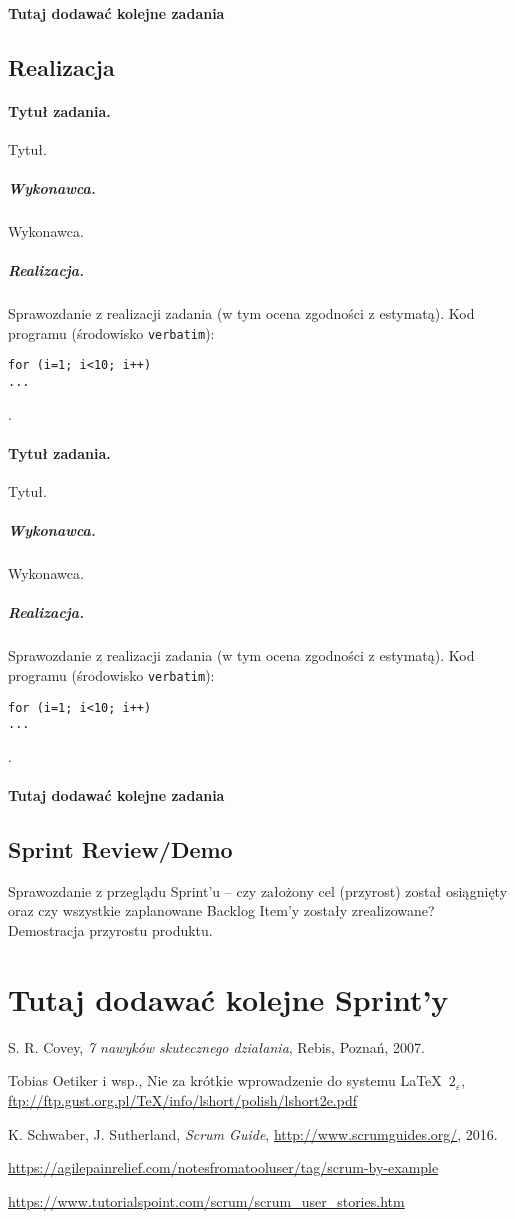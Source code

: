 \documentclass[a4paper]{article}
\begin{document}
\paragraph{Tutaj dodawać kolejne zadania}

\subsection{Realizacja}

\paragraph{Tytuł zadania.} Tytuł.
\subparagraph{Wykonawca.} Wykonawca.
\subparagraph{Realizacja.} Sprawozdanie z realizacji zadania (w tym ocena zgodności z estymatą). Kod programu (środowisko \texttt{verbatim}): \begin{verbatim}
for (i=1; i<10; i++)
...
\end{verbatim}.

\paragraph{Tytuł zadania.} Tytuł.
\subparagraph{Wykonawca.} Wykonawca.
\subparagraph{Realizacja.} Sprawozdanie z realizacji zadania (w tym ocena zgodności z estymatą). Kod programu (środowisko \texttt{verbatim}): \begin{verbatim}
for (i=1; i<10; i++)
...
\end{verbatim}.

\paragraph{Tutaj dodawać kolejne zadania}


\subsection{Sprint Review/Demo}
Sprawozdanie z przeglądu Sprint'u -- czy założony cel (przyrost) został osiągnięty oraz czy wszystkie zaplanowane Backlog Item'y zostały zrealizowane? Demostracja przyrostu produktu.


\section*{Tutaj dodawać kolejne Sprint'y}


\begin{thebibliography}{9}

 S. R. Covey, {\em 7 nawyków skutecznego działania}, Rebis, Poznań, 2007.

 Tobias Oetiker i wsp., Nie za krótkie wprowadzenie do systemu \LaTeX  \ $2_\varepsilon$, \url{ftp://ftp.gust.org.pl/TeX/info/lshort/polish/lshort2e.pdf}

 K. Schwaber, J. Sutherland, {\em Scrum Guide}, \url{http://www.scrumguides.org/}, 2016.

 \url{https://agilepainrelief.com/notesfromatooluser/tag/scrum-by-example}

 \url{https://www.tutorialspoint.com/scrum/scrum_user_stories.htm}

\end{thebibliography}
\end{document}
